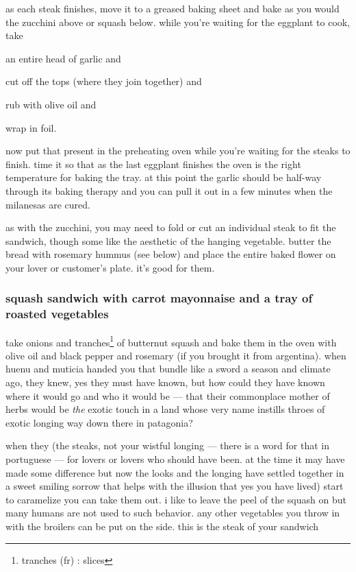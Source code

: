 as each steak finishes, move it to a greased baking sheet and bake as
you would the zucchini above or squash below. while you're waiting for
the eggplant to cook, take

\begin{algorithm}
  \item an entire head of garlic and
  \item cut off the tops (where they join together) and
  \item rub with olive oil and
  \item wrap in foil.
\end{algorithm}

now put that present in the preheating oven while you're waiting
for the steaks to finish. time it so that as the last eggplant
finishes the oven is the right temperature for baking the tray. at
this point the garlic should be half-way through its baking therapy
and you can pull it out in a few minutes when the milanesas are cured.

as with the zucchini, you may need to fold or cut an individual steak
to fit the sandwich, though some like the aesthetic of the hanging
vegetable. butter the bread with rosemary hummus (see below) and place
the entire baked flower on your lover or customer's plate. it's good
for them.

\subsubsection{squash sandwich with carrot mayonnaise and a tray of roasted vegetables}

take onions and tranches\footnote{tranches (fr) : slices} of butternut
squash and bake them in the oven with olive oil and black pepper and
rosemary (if you brought it from argentina). when huenu and muticia
handed you that bundle like a sword a season and climate ago, they
knew, yes they must have known, but how could they have known where it
would go and who it would be --- that their commonplace mother of
herbs would be \textit{the} exotic touch in a land whose very name
instills throes of exotic longing way down there in patagonia?

when they (the steaks, not your wistful longing --- there is a word
for that in portuguese --- for lovers or lovers who should have
been. at the time it may have made some difference but now the looks
and the longing have settled together in a sweet smiling sorrow that
helps with the illusion that yes you have lived) start to caramelize
you can take them out. i like to leave the peel of the squash on but
many humans are not used to such behavior. any other vegetables you
throw in with the broilers can be put on the side. this is the steak
of your sandwich


